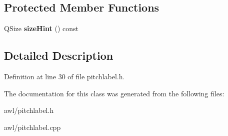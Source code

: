 \subsection*{Protected Member Functions}
\begin{DoxyCompactItemize}
\item 
\mbox{\label{class_awl_1_1_pitch_label_a09c3680559a3a8009739e1e280a21523}} 
Q\+Size {\bfseries size\+Hint} () const
\end{DoxyCompactItemize}


\subsection{Detailed Description}


Definition at line 30 of file pitchlabel.\+h.



The documentation for this class was generated from the following files\+:\begin{DoxyCompactItemize}
\item 
awl/pitchlabel.\+h\item 
awl/pitchlabel.\+cpp\end{DoxyCompactItemize}
